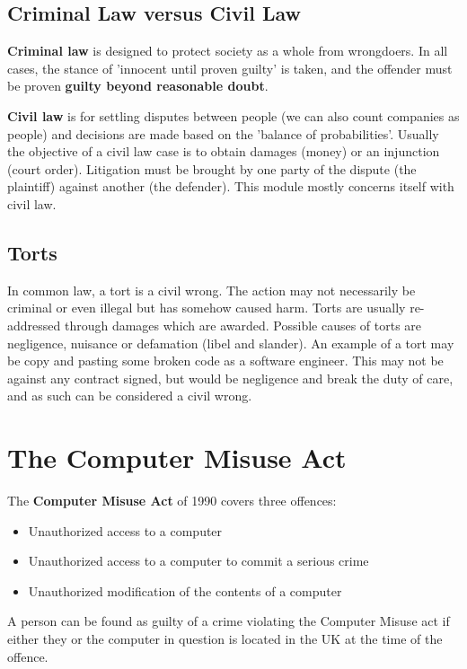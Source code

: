 \documentclass{article}
\begin{document}
	\subsection{Criminal Law versus Civil Law}
	\textbf{Criminal law} is designed to protect society as a whole from wrongdoers. In all cases, the stance of 'innocent until proven guilty' is taken, and the offender must be proven \textbf{guilty beyond reasonable doubt}.	
	\par 
	\textbf{Civil law} is for settling disputes between people (we can also count companies as people) and decisions are made based on the 'balance of probabilities'. Usually the objective of a civil law case is to obtain damages (money) or an injunction (court order). Litigation must be brought by one party of the dispute (the plaintiff) against another (the defender). This module mostly concerns itself with civil law.
	
	\subsection{Torts}
	In common law, a tort is a civil wrong. The action may not necessarily be criminal or even illegal but has somehow caused harm. Torts are usually re-addressed through damages which are awarded. Possible causes of torts are negligence, nuisance or defamation (libel and slander). An example of a tort may be copy and pasting some broken code as a software engineer. This may not be against any contract signed, but would be negligence and break the duty of care, and as such can be considered a civil wrong.
	
	\section{The Computer Misuse Act}
	The \textbf{Computer Misuse Act} of 1990 covers three offences:
	\begin{itemize}
		\item Unauthorized access to a computer
		\item Unauthorized access to a computer to commit a serious crime
		\item Unauthorized modification of the contents of a computer
	\end{itemize}
	
	A person can be found as guilty of a crime violating the Computer Misuse act if either they or the computer in question is located in the UK at the time of the offence.
	
\end{document}
